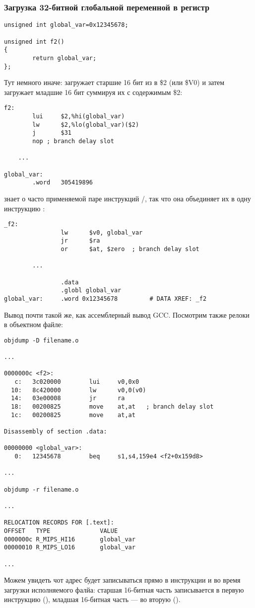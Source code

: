 \subsubsection{Загрузка 32-битной глобальной переменной в регистр}

\begin{lstlisting}[style=customc]
unsigned int global_var=0x12345678;

unsigned int f2()
{
        return global_var;
};
\end{lstlisting}


Тут немного иначе:  загружает старшие 16 бит из  в \$2 (или \$V0) и затем  загружает младшие
16 бит суммируя их с содержимым \$2:

\begin{lstlisting}[caption=GCC 4.4.5 -O3 (\assemblyOutput),style=customasmMIPS]
f2:
        lui     $2,%hi(global_var)
        lw      $2,%lo(global_var)($2)
        j       $31
        nop	; branch delay slot

	...

global_var:
        .word   305419896
\end{lstlisting}

\IDA знает о часто применяемой паре инструкций /, так что она объединяет их в одну инструкцию :

\begin{lstlisting}[caption=GCC 4.4.5 -O3 (IDA),style=customasmMIPS]
_f2:
                lw      $v0, global_var
                jr      $ra
                or      $at, $zero	; branch delay slot

		...

                .data
                .globl global_var
global_var:     .word 0x12345678         # DATA XREF: _f2
\end{lstlisting}

Вывод  почти такой же, как ассемблерный вывод GCC.
Посмотрим также релоки в объектном файле:

\begin{lstlisting}[caption=objdump,style=customasmMIPS]
objdump -D filename.o

...

0000000c <f2>:
   c:   3c020000        lui     v0,0x0
  10:   8c420000        lw      v0,0(v0)
  14:   03e00008        jr      ra
  18:   00200825        move    at,at	; branch delay slot
  1c:   00200825        move    at,at

Disassembly of section .data:

00000000 <global_var>:
   0:   12345678        beq     s1,s4,159e4 <f2+0x159d8>

...

objdump -r filename.o

...

RELOCATION RECORDS FOR [.text]:
OFFSET   TYPE              VALUE
0000000c R_MIPS_HI16       global_var
00000010 R_MIPS_LO16       global_var

...

\end{lstlisting}

Можем увидеть чот адрес  будет записываться прямо в инструкции  и  во время загрузки исполняемого
фалйа:
старшая 16-битная часть  записывается в первую инструкцию (), младшая 16-битная часть ---
во вторую ().

